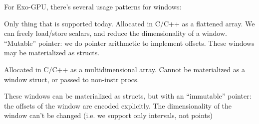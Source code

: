 \filbreak
{}



\filbreak
{}



\filbreak
{}

For Exo-GPU, there's several usage patterns for windows:

\filbreak
{} Only thing that is supported today.
Allocated in C/C++ as a flattened array.
We can freely load/store scalars, and reduce the dimensionality of a window.
``Mutable'' pointer: we do pointer arithmetic to implement offsets.
These windows may be materialized as structs.



\filbreak
{} Allocated in C/C++ as a multidimensional array.
Cannot be materialized as a window struct, or passed to non-instr procs.



\filbreak
{}
These windows can be materialized as structs, but with an ``immutable'' pointer: the offsets of the window are encoded explicitly.
The dimensionality of the window can't be changed (i.e. we support only intervals, not points)



